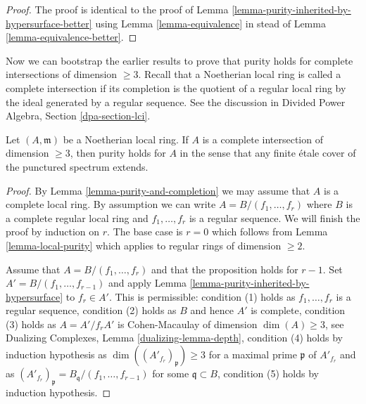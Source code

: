 \begin{proof}
The proof is identical to the proof of
Lemma \ref{lemma-purity-inherited-by-hypersurface-better}
using
Lemma \ref{lemma-equivalence}
in stead of
Lemma \ref{lemma-equivalence-better}.
\end{proof}

\noindent
Now we can bootstrap the earlier results to prove that
purity holds for complete intersections of dimension $\geq 3$.
Recall that a Noetherian local ring is called a complete
intersection if its completion is the quotient of a
regular local ring by the ideal generated by a regular sequence.
See the discussion in Divided Power Algebra, Section \ref{dpa-section-lci}.

\begin{proposition}
\label{proposition-purity-complete-intersection}
Let $(A, \mathfrak m)$ be a Noetherian local ring. If $A$ is a
complete intersection of dimension $\geq 3$, then purity
holds for $A$ in the sense that any finite \'etale cover of
the punctured spectrum extends.
\end{proposition}

\begin{proof}
By Lemma \ref{lemma-purity-and-completion} we may assume that $A$ is
a complete local ring. By assumption we can write
$A = B/(f_1, \ldots, f_r)$ where $B$ is a complete regular local
ring and $f_1, \ldots, f_r$ is a regular sequence.
We will finish the proof by induction on $r$.
The base case is $r = 0$ which follows from
Lemma \ref{lemma-local-purity} which applies to
regular rings of dimension $\geq 2$.

\medskip\noindent
Assume that $A = B/(f_1, \ldots, f_r)$ and that the proposition
holds for $r - 1$. Set $A' = B/(f_1, \ldots, f_{r - 1})$ and apply
Lemma \ref{lemma-purity-inherited-by-hypersurface} to $f_r \in A'$.
This is permissible:
condition (1) holds as $f_1, \ldots, f_r$ is a regular sequence,
condition (2) holds as $B$ and hence $A'$ is complete,
condition (3) holds as $A = A'/f_r A'$ is Cohen-Macaulay of dimension
$\dim(A) \geq 3$, see Dualizing Complexes, Lemma \ref{dualizing-lemma-depth},
condition (4) holds by induction hypothesis as
$\dim((A'_{f_r})_\mathfrak p) \geq 3$ for a maximal
prime $\mathfrak p$ of $A'_{f_r}$ and as
$(A'_{f_r})_\mathfrak p = B_\mathfrak q/(f_1, \ldots, f_{r - 1})$
for some $\mathfrak q \subset B$,
condition (5) holds by induction hypothesis.
\end{proof}






